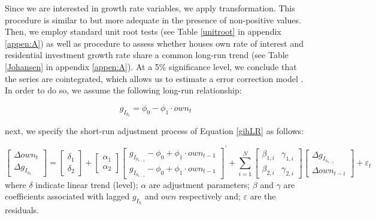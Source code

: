 \documentclass[12pt, a4paper]{article}
\begin{document}
Since we are interested in growth rate variables, we apply \textcite{yeo_new_2000} transformation.
This procedure is similar to \textcite{box_analysis_1964} but more adequate in the presence of non-positive values.
Then, we employ standard unit root tests (see Table \ref{unitroot} in appendix \ref{appen:A}) as well as \textcite{johansen_estimation_1991} procedure to assess whether houses own rate of interest and residential investment growth rate share a common long-run trend (see Table \ref{Johansen} in appendix \ref{appen:A}).
At a 5\% significance level, we conclude that the series are cointegrated, which allows us to estimate a error correction model \cite{enders_applied_2014}.
In order to do so, we assume the following long-run relationship:

\begin{latex}
\begin{equation}
\label{gihLR}
g_{I_{h_{t}}} = \phi_{0} - \phi_{1}\cdot own_{t}
\end{equation}
\end{latex}
next, we specify the short-run adjustment process of Equation \ref{gihLR} as follows:

\begin{equation}
\begin{bmatrix}
\Delta own_{t}\\
\Delta g_{I_{h_{t}}}
\end{bmatrix} = \begin{bmatrix}\delta_{1}\\ \delta_{2}\end{bmatrix} + \begin{bmatrix}\alpha_{1}\\ \alpha_{2}\end{bmatrix} \begin{bmatrix}g_{I_{h_{t-1}}} - \phi_{0} + \phi_{1}\cdot own_{t-1}\\g_{I_{h_{t-1}}} - \phi_{0} + \phi_{1}\cdot own_{t-1}\end{bmatrix}^{\prime} + \sum^N_{i=1} \begin{bmatrix}\beta_{1,i} & \gamma_{1,i} \\\beta_{2,i} & \gamma_{2,i} \end{bmatrix} \begin{bmatrix}\Delta g_{I_{h_{t-i}}} \\\Delta own_{t-i}\end{bmatrix} + \varepsilon_{t}
\end{equation}
where \(\delta\) indicate linear trend (level);
\(\alpha\) are adjustment parameters;
\(\beta\) and \(\gamma\) are coefficients associated with lagged \(g_{I_h}\) and \(own\) respectively and; \(\varepsilon\) are the residuals.
\end{document}
